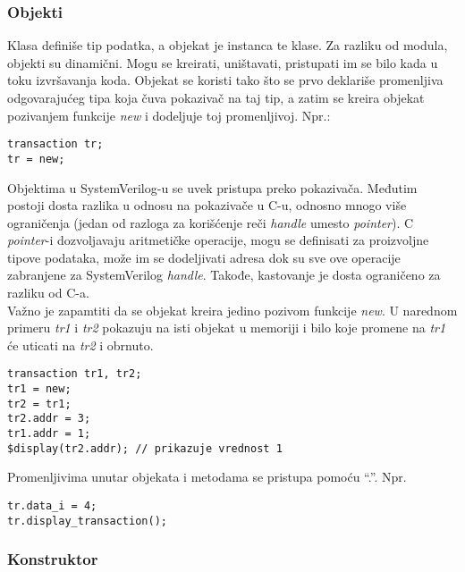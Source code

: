 
\subsubsection{Objekti}

Klasa definiše tip podatka, a objekat je instanca te klase. Za razliku od
modula, objekti su dinamični. Mogu se kreirati, uništavati, pristupati im se
bilo kada u toku izvršavanja koda. Objekat se koristi tako što se prvo deklariše
promenljiva odgovarajućeg tipa koja čuva pokazivač na taj tip, a zatim se kreira
objekat pozivanjem funkcije \emph{new} i dodeljuje toj promenljivoj. Npr.:

\begin{lstlisting}
transaction tr;
tr = new;
\end{lstlisting}

Objektima u SystemVerilog-u se uvek pristupa preko pokazivača. Međutim postoji
dosta razlika u odnosu na pokazivače u C-u, odnosno mnogo više ograničenja
(jedan od razloga za korišćenje reči \emph{handle} umesto \emph{pointer}). C
\emph{pointer}-i dozvoljavaju aritmetičke operacije, mogu se definisati za
proizvoljne tipove podataka, može im se dodeljivati adresa dok su sve ove
operacije zabranjene za SystemVerilog \emph{handle}. Takođe, kastovanje je
dosta ograničeno za razliku od C-a.\\

Važno je zapamtiti da se objekat kreira jedino pozivom funkcije \emph{new}. U
narednom primeru \emph{tr1} i \emph{tr2} pokazuju na isti objekat u memoriji i
bilo koje promene na \emph{tr1} će uticati na \emph{tr2} i obrnuto.

\begin{lstlisting}
transaction tr1, tr2;
tr1 = new;
tr2 = tr1;
tr2.addr = 3;
tr1.addr = 1;
$display(tr2.addr); // prikazuje vrednost 1
\end{lstlisting}

Promenljivima unutar objekata i metodama se pristupa pomoću ``.''. Npr.

\begin{lstlisting}
tr.data_i = 4;
tr.display_transaction();
\end{lstlisting}


\subsubsection{Konstruktor}

